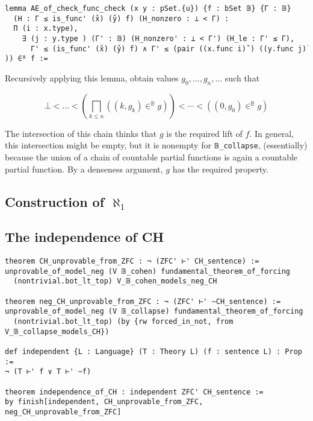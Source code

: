 \documentclass[sigplan,10pt,review, anonymous]{acmart}
\theoremstyle{definition}
\begin{document}
\begin{lstlisting}
lemma AE_of_check_func_check (x y : pSet.{u}) {f : bSet 𝔹} {Γ : 𝔹}
  (H : Γ ≤ is_func' (x̌) (y̌) f) (H_nonzero : ⊥ < Γ) :
  Π (i : x.type),
    ∃ (j : y.type ) (Γ' : 𝔹) (H_nonzero' : ⊥ < Γ') (H_le : Γ' ≤ Γ),
      Γ' ≤ (is_func' (x̌) (y̌) f) ∧ Γ' ≤ (pair ((x.func i)̌ ) ((y.func j)̌ )) ∈ᴮ f :=
\end{lstlisting}

Recursively applying this lemma, obtain values \(g_0, \dots, g_n, \dots\) such that

\[\bot < \dots < \left(\bigsqcap_{k \leq n} ((k, g_k) \in^{\mathbb{B}} g)\right) < \cdots < ((0 , g_0) \in^{\mathbb{B}} g)\]

The intersection of this chain thinks that \(g\) is the required lift of \(f\). In general, this intersection might be empty, but it is nonempty for \lstinline{𝔹_collapse}, (essentially) because the union of a chain of countable partial functions is again a countable partial function. By a denseness argument, \(g\) has the required property.


\subsection{Construction of $\aleph_1$} \label{subsection:forcing:aleph-1}


\subsection{The independence of CH} \label{subsection:forcing:independence}

\begin{lstlisting}
theorem CH_unprovable_from_ZFC : ¬ (ZFC' ⊢' CH_sentence) :=
unprovable_of_model_neg (V 𝔹_cohen) fundamental_theorem_of_forcing
  (nontrivial.bot_lt_top) V_𝔹_cohen_models_neg_CH

theorem neg_CH_unprovable_from_ZFC : ¬ (ZFC' ⊢' ∼CH_sentence) :=
unprovable_of_model_neg (V 𝔹_collapse) fundamental_theorem_of_forcing
  (nontrivial.bot_lt_top) (by {rw forced_in_not, from V_𝔹_collapse_models_CH})

def independent {L : Language} (T : Theory L) (f : sentence L) : Prop :=
¬ (T ⊢' f ∨ T ⊢' ∼f)

theorem independence_of_CH : independent ZFC' CH_sentence :=
by finish[independent, CH_unprovable_from_ZFC, neg_CH_unprovable_from_ZFC]
\end{lstlisting}
\end{document}
